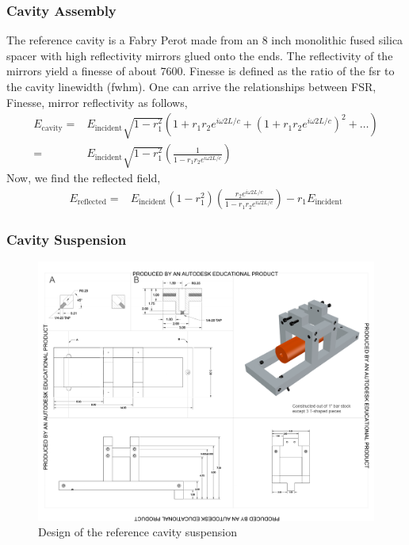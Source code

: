 \subsubsection{Cavity Assembly}

The reference cavity is a Fabry Perot made from an 8 inch monolithic fused silica
spacer with high reflectivity mirrors glued onto the ends. The reflectivity
of the mirrors yield a finesse of about 7600. Finesse is defined as the ratio
of the \ac{fsr} to the cavity linewidth (\ac{fwhm}). One can arrive the
relationships between FSR, Finesse, mirror reflectivity as follows,
\begin{align}
E_{\mathrm{cavity}} =& E_{\mathrm{incident}} \sqrt{1-r_1^2} \left( 1 + r_1 r_2
    e^{i \omega 2 L /c} + \left(1+r_1 r_2 e^{i \omega 2L/c} \right)^2 + \ldots \right)
    \\
=& E_{\mathrm{incident}} \sqrt{1-r_1^2} \left( \frac{1}{1 - r_1 r_2
    e^{i \omega 2L/c}} \right)
\end{align}
Now, we find the reflected field,
\begin{align}
E_{\mathrm{reflected}} =& E_{\mathrm{incident}} \left( 1-r_1^2 \right)
    \left( \frac{r_2 e^{i \omega 2L/c}}{1 - r_1 r_2 e^{i \omega 2L/c}} \right)
    - r_1 E_{\mathrm{incident}}
\end{align}

\subsubsection{Cavity Suspension}
\begin{figure}[htbp]
	\centering
		\includegraphics[width=15cm]{./figures/refcavsusdesign.pdf}
	\caption[Reference Cavity Suspension Design]{Design of the reference cavity suspension}
	\label{fig:refcav_sus}
\end{figure}

